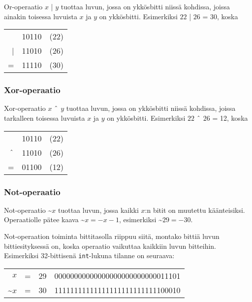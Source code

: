Or-operaatio $x$ | $y$ tuottaa luvun,
jossa on ykkösbitti niissä kohdissa,
joissa ainakin toisessa luvuista $x$ ja $y$ on ykkösbitti.
Esimerkiksi $22$ | $26$ = 30, koska

\begin{center}
\begin{tabular}{rrr}
& 10110 & (22)\\
| & 11010 & (26) \\
\hline
 = & 11110 & (30) \\
\end{tabular}
\end{center}

\subsubsection{Xor-operaatio}

Xor-operaatio $x$ $\XOR$ $y$ tuottaa luvun,
jossa on ykkösbitti niissä kohdissa,
joissa tarkalleen toisessa luvuista $x$ ja $y$ on ykkösbitti.
Esimerkiksi $22$ $\XOR$ $26$ = 12, koska

\begin{center}
\begin{tabular}{rrr}
& 10110 & (22)\\
$\XOR$ & 11010 & (26) \\
\hline
 = & 01100 & (12) \\
\end{tabular}
\end{center}

\subsubsection{Not-operaatio}

Not-operaatio \textasciitilde$x$ tuottaa luvun,
jossa kaikki $x$:n bitit on muutettu käänteisiksi.
Operaatiolle pätee kaava \textasciitilde$x = -x-1$,
esimerkiksi \textasciitilde$29 = -30$.

Not-operaation toiminta bittitasolla riippuu siitä,
montako bittiä luvun bittiesityksessä on,
koska operaatio vaikuttaa kaikkiin luvun bitteihin.
Esimerkiksi 32-bittisenä \texttt{int}-lukuna
tilanne on seuraava:

\begin{center}
\begin{tabular}{rrrr}
$x$ & = & 29 &   00000000000000000000000000011101 \\
\textasciitilde$x$ & = & 30 & 11111111111111111111111111100010 \\
\end{tabular}
\end{center}



